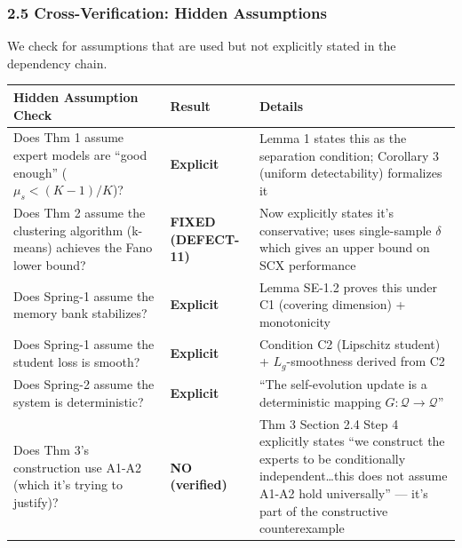 \documentclass[
  12pt,
]{ctexart}
\begin{document}
\subsubsection{2.5 Cross-Verification: Hidden
Assumptions}\label{cross-verification-hidden-assumptions}

We check for assumptions that are used but not explicitly stated in the
dependency chain.

\begin{longtable}[]{@{}
  >{\raggedright\arraybackslash}p{}
  >{\raggedright\arraybackslash}p{}
  >{\raggedright\arraybackslash}p{}@{}}
\toprule\noalign{}
\begin{minipage}[b]{\linewidth}\raggedright
Hidden Assumption Check
\end{minipage} & \begin{minipage}[b]{\linewidth}\raggedright
Result
\end{minipage} & \begin{minipage}[b]{\linewidth}\raggedright
Details
\end{minipage} \\
\midrule\noalign{}
\endhead
\bottomrule\noalign{}
\endlastfoot
Does Thm 1 assume expert models are ``good enough''
(\(\mu_s < (K-1)/K\))? & \textbf{Explicit} & Lemma 1 states this as the
separation condition; Corollary 3 (uniform detectability) formalizes
it \\
Does Thm 2 assume the clustering algorithm (k-means) achieves the Fano
lower bound? & \textbf{FIXED (DEFECT-11)} & Now explicitly states it's
conservative; uses single-sample \(\delta\) which gives an upper bound
on SCX performance \\
Does Spring-1 assume the memory bank stabilizes? & \textbf{Explicit} &
Lemma SE-1.2 proves this under C1 (covering dimension) + monotonicity \\
Does Spring-1 assume the student loss is smooth? & \textbf{Explicit} &
Condition C2 (Lipschitz student) + \(L_g\)-smoothness derived from C2 \\
Does Spring-2 assume the system is deterministic? & \textbf{Explicit} &
``The self-evolution update is a deterministic mapping
\(G: \mathcal{Q} \to \mathcal{Q}\)'' \\
Does Thm 3's construction use A1-A2 (which it's trying to justify)? &
\textbf{NO (verified)} & Thm 3 Section 2.4 Step 4 explicitly states ``we
construct the experts to be conditionally independent\ldots this does
not assume A1-A2 hold universally'' --- it's part of the constructive
counterexample \\
\end{longtable}
\end{document}
